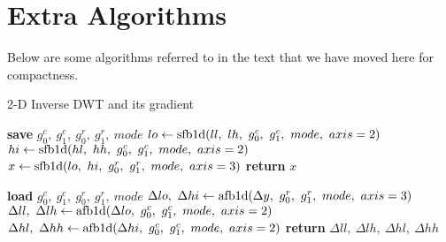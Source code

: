 \section{Extra Algorithms}
Below are some algorithms referred to in the text that we have moved here for
compactness.
\begin{algorithm}[h!]
\caption{2-D Inverse DWT and its gradient}\label{alg:appB:idwt}
\begin{algorithmic}[1]
  \State \textbf{save} $g_0^c,\ g_1^c,\ g_0^r,\ g_1^r,\ mode$  \label{line:appB:idwt_save}
  \State $lo \gets \F{sfb1d}(ll,\ lh,\ g_0^c,\ g_1^c,\ mode,\ axis=2) $ 
  \State $hi \gets \F{sfb1d}(hl,\ hh,\ g_0^c,\ g_1^c,\ mode,\ axis=2) $
  \State $x \gets \mathrm{sfb1d}(lo,\ hi,\ g_0^r,\ g_1^r,\ mode,\ axis=3) $
  \State \textbf{return} $x$
\EndFunction
\end{algorithmic}\vspace{10pt}
\begin{algorithmic}[1]
  \State \textbf{load} $g_0^c,\ g_1^c,\ g_0^r,\ g_1^r,\ mode$
  \State $\Delta lo,\ \Delta hi \gets \mathrm{afb1d}(\Delta y,\ g_0^r,\ g_1^r,\ mode,\ axis=3)$ 
  \State $\Delta ll,\ \Delta lh \gets \F{afb1d}(\Delta lo,\ g_0^c,\ g_1^c,\ mode,\ axis=2)$ 
  \State $\Delta hl,\ \Delta hh \gets \F{afb1d}(\Delta hi,\ g_0^c,\ g_1^c,\ mode,\ axis=2)$ 
  \State \textbf{return} $\Delta ll,\ \Delta lh,\ \Delta hl,\ \Delta hh$
\EndFunction
\end{algorithmic}
\end{algorithm}

